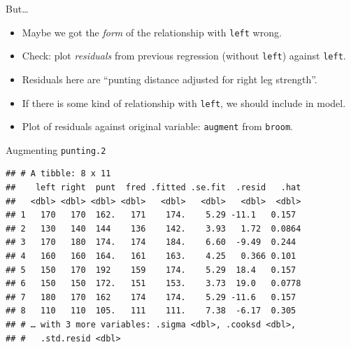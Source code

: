 \documentclass[ignorenonframetext,]{beamer}
\newenvironment{Shaded}{\begin{snugshade}}{\end{snugshade}}
\newcommand{\DecValTok}[1]{\textcolor[rgb]{0.00,0.00,0.81}{#1}}
\newcommand{\FloatTok}[1]{\textcolor[rgb]{0.00,0.00,0.81}{#1}}
\newcommand{\KeywordTok}[1]{\textcolor[rgb]{0.13,0.29,0.53}{\textbf{#1}}}
\newcommand{\NormalTok}[1]{#1}
\newcommand{\OperatorTok}[1]{\textcolor[rgb]{0.81,0.36,0.00}{\textbf{#1}}}
\newcommand{\StringTok}[1]{\textcolor[rgb]{0.31,0.60,0.02}{#1}}
\begin{document}
\begin{frame}[fragile]{But\ldots}
\protect\hypertarget{but}{}

\begin{itemize}
\item
  Maybe we got the \emph{form} of the relationship with \texttt{left}
  wrong.
\item
  Check: plot \emph{residuals} from previous regression (without
  \texttt{left}) against \texttt{left}.
\item
  Residuals here are ``punting distance adjusted for right leg
  strength''.
\item
  If there is some kind of relationship with \texttt{left}, we should
  include in model.
\item
  Plot of residuals against original variable: \texttt{augment} from
  \texttt{broom}.
\end{itemize}

\end{frame}

\begin{frame}[fragile]{Augmenting \texttt{punting.2}}
\protect\hypertarget{augmenting-punting.2}{}

\footnotesize

\begin{Shaded}
\end{Shaded}

\begin{verbatim}
## # A tibble: 8 x 11
##    left right  punt  fred .fitted .se.fit  .resid   .hat
##   <dbl> <dbl> <dbl> <dbl>   <dbl>   <dbl>   <dbl>  <dbl>
## 1   170   170  162.   171    174.    5.29 -11.1   0.157 
## 2   130   140  144    136    142.    3.93   1.72  0.0864
## 3   170   180  174.   174    184.    6.60  -9.49  0.244 
## 4   160   160  164.   161    163.    4.25   0.366 0.101 
## 5   150   170  192    159    174.    5.29  18.4   0.157 
## 6   150   150  172.   151    153.    3.73  19.0   0.0778
## 7   180   170  162    174    174.    5.29 -11.6   0.157 
## 8   110   110  105.   111    111.    7.38  -6.17  0.305 
## # … with 3 more variables: .sigma <dbl>, .cooksd <dbl>,
## #   .std.resid <dbl>
\end{verbatim}

\normalsize

\end{frame}
\end{document}
